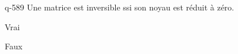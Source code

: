 \begin{truefalse}{q-589}
Une matrice est inversible ssi son noyau est réduit à zéro.
\item Vrai
\item* Faux
\end{truefalse}

